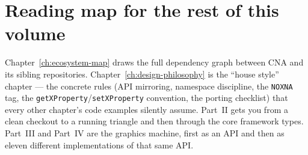 \section{Reading map for the rest of this volume}

Chapter~\ref{ch:ecosystem-map} draws the full dependency graph between CNA and its sibling
repositories. Chapter~\ref{ch:design-philosophy} is the ``house style'' chapter --- the
concrete rules (API mirroring, namespace discipline, the \texttt{NOXNA} tag, the
\texttt{getXProperty}/\texttt{setXProperty} convention, the porting checklist) that every
other chapter's code examples silently assume. Part~II gets you from a clean checkout to a
running triangle and then through the core framework types. Part~III and Part~IV are the
graphics machine, first as an API and then as eleven different implementations of that same
API.
